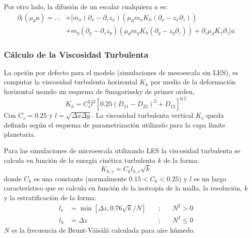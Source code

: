 Por otro lado, la difusión de un escalar cualquiera $a$ es:
\begin{equation}\begin{split}
\partial_t(\mu_d a) = ... &+ [m_x(\partial_x-\partial_z z_x)(\mu_d m_x K_h(\partial_x - z_x\partial_z)) \\
&+m_y(\partial_y-\partial_z z_y)(\mu_d m_y K_h(\partial_y-z_y\partial_z))+\partial_z\mu_dK_v\partial_z]a
\end{split}\end{equation}

\subsubsection{Cálculo de la Viscosidad Turbulenta}
La opción por defecto para el modelo (simulaciones de mesoescala sin LES), es computar la viscosidad turbulenta horizontal $K_h$ por medio de la deformación horizontal usando un esquema de Smagorinsky de primer orden,
\begin{equation}
K_h = C_s^2 l^2[0.25(D_{11}-D_{22})^2+D_{12}]^{0.5}
\end{equation}
Con $C_s=0.25$ y $l=\sqrt{\Delta x\Delta y}$. La viscosidad turbulenta vertical $K_v$ queda definida según el esquema de parametrización utilizado para la capa límite planetaria.

Para las simulaciones de microescala utilizando LES la viscosidad turbulenta se calcula en función de la energía cinética turbulenta $k$ de la forma:
\begin{equation}
K_{h,v}=C_k l_{h,v}\sqrt{k}
\end{equation}
donde $C_k$ es una constante (normalmente $0.15<C_k<0.25$) y $l$ es un largo característico que se calcula en función de la isotropía de la malla, la resolución, $k$ y la estratificación de la forma:
\begin{align}
	l_v &= \min[\Delta z, 0.76\sqrt{k}/N]\quad&;&\quad N^2>0\\
	l_h &= \Delta z\quad&;&\quad N^2\leq 0
\end{align}
$N$ es la frecuencia de Brunt-Väisälä calculada para aire húmedo.

